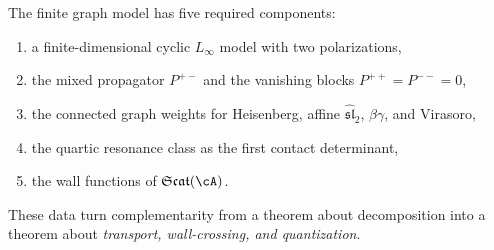 \begin{remark}
\label{rem:nms-implementation-path}
The finite graph model has five required components:
\begin{enumerate}[label=\textup{(\arabic*)}]
\item a finite-dimensional cyclic $L_\infty$ model with two
polarizations,
\item the mixed propagator $P^{+-}$ and the vanishing blocks
$P^{++}=P^{--}=0$,
\item the connected graph weights for Heisenberg, affine
$\widehat{\mathfrak{sl}}_2$, $\beta\gamma$, and Virasoro,
\item the quartic resonance class as the first contact determinant,
\item the wall functions of $\mathfrak{Scat}(\cA)$.
\end{enumerate}
These data turn complementarity from a theorem about decomposition into
a theorem about \emph{transport, wall-crossing, and quantization}.
\end{remark}


